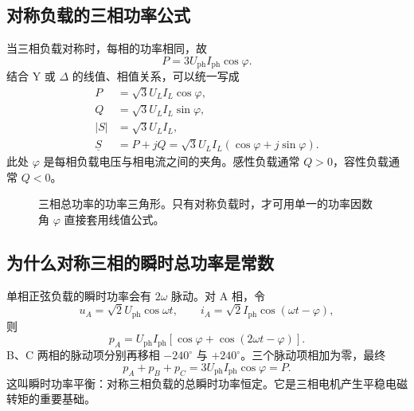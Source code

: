 \documentclass[circuit]{CarlosTexRpt}
\newcommand{\phas}[1]{\underline{#1}}
\begin{document}
\subsection{对称负载的三相功率公式}

当三相负载对称时，每相的功率相同，故
\begin{equation}
  P=3U_{\mathrm{ph}}I_{\mathrm{ph}}\cos\varphi.
\end{equation}
结合 Y 或 \(\Delta\) 的线值、相值关系，可以统一写成
\begin{align}
  \boxed{P}&=\sqrt3 U_L I_L\cos\varphi,\\
  \boxed{Q}&=\sqrt3 U_L I_L\sin\varphi,\\
  \boxed{|S|}&=\sqrt3 U_L I_L,\\
  \boxed{\phas S}&=P+jQ=\sqrt3 U_L I_L(\cos\varphi+j\sin\varphi).
\end{align}
此处 \(\varphi\) 是每相负载电压与相电流之间的夹角。感性负载通常 \(Q>0\)，容性负载通常 \(Q<0\)。

\begin{figure}[H]
  \centering
  \caption{三相总功率的功率三角形。只有对称负载时，才可用单一的功率因数角 \(\varphi\) 直接套用线值公式。}
\end{figure}

\subsection{为什么对称三相的瞬时总功率是常数}

单相正弦负载的瞬时功率会有 \(2\omega\) 脉动。对 A 相，令
\[
  u_A=\sqrt2 U_{\mathrm{ph}}\cos\omega t,\qquad
  i_A=\sqrt2 I_{\mathrm{ph}}\cos(\omega t-\varphi),
\]
则
\begin{equation}
  p_A=U_{\mathrm{ph}}I_{\mathrm{ph}}\left[\cos\varphi+\cos(2\omega t-\varphi)\right].
\end{equation}
B、C 两相的脉动项分别再移相 \(-240^\circ\) 与 \(+240^\circ\)。三个脉动项相加为零，最终
\begin{equation}
  \boxed{p_A+p_B+p_C=3U_{\mathrm{ph}}I_{\mathrm{ph}}\cos\varphi=P}.
\end{equation}
这叫瞬时功率平衡：对称三相负载的总瞬时功率恒定。它是三相电机产生平稳电磁转矩的重要基础。
\end{document}
